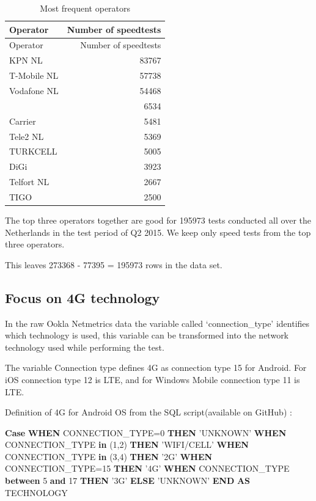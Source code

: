 \documentclass[]{article}
\newenvironment{Shaded}{\begin{snugshade}}{\end{snugshade}}
\newcommand{\KeywordTok}[1]{\textcolor[rgb]{0.13,0.29,0.53}{\textbf{{#1}}}}
\newcommand{\DecValTok}[1]{\textcolor[rgb]{0.00,0.00,0.81}{{#1}}}
\newcommand{\StringTok}[1]{\textcolor[rgb]{0.31,0.60,0.02}{{#1}}}
\newcommand{\NormalTok}[1]{{#1}}
\begin{document}
\begin{longtable}[c]{@{}lr@{}}
\caption{Most frequent operators}\tabularnewline
\toprule
Operator & Number of speedtests\tabularnewline
\midrule
\endfirsthead
\toprule
Operator & Number of speedtests\tabularnewline
\midrule
\endhead
KPN NL & 83767\tabularnewline
T-Mobile NL & 57738\tabularnewline
Vodafone NL & 54468\tabularnewline
& 6534\tabularnewline
Carrier & 5481\tabularnewline
Tele2 NL & 5369\tabularnewline
TURKCELL & 5005\tabularnewline
DiGi & 3923\tabularnewline
Telfort NL & 2667\tabularnewline
TIGO & 2500\tabularnewline
\bottomrule
\end{longtable}

The top three operators together are good for 195973 tests conducted all
over the Netherlands in the test period of Q2 2015. We keep only speed
tests from the top three operators.

This leaves 273368 - 77395 = 195973 rows in the data set.

\subsection{Focus on 4G technology}\label{focus-on-4g-technology}

In the raw Ookla Netmetrics data the variable called `connection\_type'
identifies which technology is used, this variable can be transformed
into the network technology used while performing the test.

The variable Connection type defines 4G as connection type 15 for
Android. For iOS connection type 12 is LTE, and for Windows Mobile
connection type 11 is LTE.

Definition of 4G for Android OS from the SQL script(available on GitHub)
:

\begin{Shaded}
\begin{Highlighting}[]
  \KeywordTok{Case}  \KeywordTok{WHEN}  \NormalTok{CONNECTION_TYPE=}\DecValTok{0}         \KeywordTok{THEN} \StringTok{'UNKNOWN'}
    \KeywordTok{WHEN}    \NormalTok{CONNECTION_TYPE }\KeywordTok{in} \NormalTok{(}\DecValTok{1}\NormalTok{,}\DecValTok{2}\NormalTok{)        }\KeywordTok{THEN} \StringTok{'WIFI/CELL'}
    \KeywordTok{WHEN}    \NormalTok{CONNECTION_TYPE }\KeywordTok{in} \NormalTok{(}\DecValTok{3}\NormalTok{,}\DecValTok{4}\NormalTok{)        }\KeywordTok{THEN} \StringTok{'2G'}
    \KeywordTok{WHEN}    \NormalTok{CONNECTION_TYPE=}\DecValTok{15}          \KeywordTok{THEN} \StringTok{'4G'}
    \KeywordTok{WHEN}    \NormalTok{CONNECTION_TYPE }\KeywordTok{between} \DecValTok{5} \KeywordTok{and} \DecValTok{17}    \KeywordTok{THEN} \StringTok{'3G'}
    \KeywordTok{ELSE}    \StringTok{'UNKNOWN'}
  \KeywordTok{END} \KeywordTok{AS} \NormalTok{TECHNOLOGY}
\end{Highlighting}
\end{Shaded}
\end{document}
